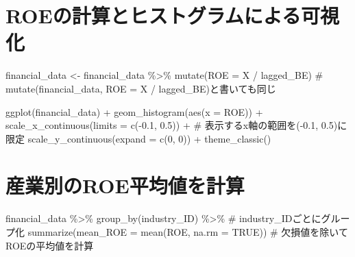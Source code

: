 \documentclass[
  letterpaper,
  DIV=11,
  numbers=noendperiod]{scrreprt}
\newenvironment{Shaded}{\begin{snugshade}}{\end{snugshade}}
\newcommand{\AttributeTok}[1]{\textcolor[rgb]{0.40,0.45,0.13}{#1}}
\newcommand{\CommentTok}[1]{\textcolor[rgb]{0.37,0.37,0.37}{#1}}
\newcommand{\ConstantTok}[1]{\textcolor[rgb]{0.56,0.35,0.01}{#1}}
\newcommand{\DecValTok}[1]{\textcolor[rgb]{0.68,0.00,0.00}{#1}}
\newcommand{\FloatTok}[1]{\textcolor[rgb]{0.68,0.00,0.00}{#1}}
\newcommand{\FunctionTok}[1]{\textcolor[rgb]{0.28,0.35,0.67}{#1}}
\newcommand{\NormalTok}[1]{\textcolor[rgb]{0.00,0.23,0.31}{#1}}
\newcommand{\OtherTok}[1]{\textcolor[rgb]{0.00,0.23,0.31}{#1}}
\newcommand{\SpecialCharTok}[1]{\textcolor[rgb]{0.37,0.37,0.37}{#1}}
\begin{document}
\section{ROEの計算とヒストグラムによる可視化}\label{roeux306eux8a08ux7b97ux3068ux30d2ux30b9ux30c8ux30b0ux30e9ux30e0ux306bux3088ux308bux53efux8996ux5316}

\begin{Shaded}
\begin{Highlighting}[]
\NormalTok{financial\_data }\OtherTok{\textless{}{-}}\NormalTok{ financial\_data }\SpecialCharTok{\%\textgreater{}\%}
  \FunctionTok{mutate}\NormalTok{(}\AttributeTok{ROE =}\NormalTok{ X }\SpecialCharTok{/}\NormalTok{ lagged\_BE) }\CommentTok{\# mutate(financial\_data, ROE = X / lagged\_BE)と書いても同じ}

\FunctionTok{ggplot}\NormalTok{(financial\_data) }\SpecialCharTok{+} 
  \FunctionTok{geom\_histogram}\NormalTok{(}\FunctionTok{aes}\NormalTok{(}\AttributeTok{x =}\NormalTok{ ROE)) }\SpecialCharTok{+}
  \FunctionTok{scale\_x\_continuous}\NormalTok{(}\AttributeTok{limits =} \FunctionTok{c}\NormalTok{(}\SpecialCharTok{{-}}\FloatTok{0.1}\NormalTok{, }\FloatTok{0.5}\NormalTok{)) }\SpecialCharTok{+} \CommentTok{\# 表示するx軸の範囲を({-}0.1, 0.5)に限定}
  \FunctionTok{scale\_y\_continuous}\NormalTok{(}\AttributeTok{expand =} \FunctionTok{c}\NormalTok{(}\DecValTok{0}\NormalTok{, }\DecValTok{0}\NormalTok{)) }\SpecialCharTok{+} 
  \FunctionTok{theme\_classic}\NormalTok{()}
\end{Highlighting}
\end{Shaded}

\section{産業別のROE平均値を計算}\label{ux7523ux696dux5225ux306eroeux5e73ux5747ux5024ux3092ux8a08ux7b97}

\begin{Shaded}
\begin{Highlighting}[]
\NormalTok{financial\_data }\SpecialCharTok{\%\textgreater{}\%} 
  \FunctionTok{group\_by}\NormalTok{(industry\_ID) }\SpecialCharTok{\%\textgreater{}\%} \CommentTok{\# industry\_IDごとにグループ化}
  \FunctionTok{summarize}\NormalTok{(}\AttributeTok{mean\_ROE =} \FunctionTok{mean}\NormalTok{(ROE, }\AttributeTok{na.rm =} \ConstantTok{TRUE}\NormalTok{)) }\CommentTok{\# 欠損値を除いてROEの平均値を計算}
\end{Highlighting}
\end{Shaded}
\end{document}
